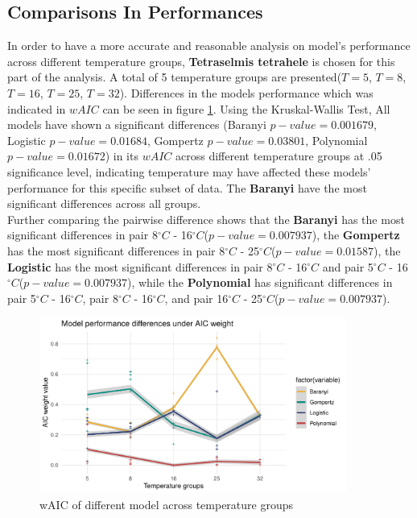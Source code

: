 \documentclass[11pt]{article}
\begin{document}
\subsection{Comparisons In Performances}\label{comparison}
In order to have a more accurate and reasonable analysis on model's performance across different temperature groups, \textbf{Tetraselmis tetrahele} is chosen for this part of the analysis. A total of 5 temperature groups are presented($T=5$, $T=8$, $T=16$, $T=25$, $T=32$). Differences in the models performance which was indicated in $wAIC$ can be seen in figure \ref{fig:tempwaic}. Using the Kruskal-Wallis Test, All models have shown a significant differences (Baranyi $p-value = 0.001679$, Logistic $p-value = 0.01684$, Gompertz $p-value = 0.03801$, Polynomial $p-value = 0.01672$) in its $wAIC$ across different temperature groups at .05 significance level, indicating temperature may have affected these models' performance for this specific subset of data. The \textbf{Baranyi} have the most significant differences across all groups. \\ 
Further comparing the pairwise difference shows that the \textbf{Baranyi} has the most significant differences in pair 8$^\circ C$ - 16$^\circ C$($p-value = 0.007937$), the \textbf{Gompertz} has the most significant differences in pair 8$^\circ C$ - 25$^\circ C$($p-value = 0.01587$), the \textbf{Logistic} has the most significant differences in pair 8$^\circ C$ - 16$^\circ C$ and pair 5$^\circ C$ - 16$^\circ C$($p-value = 0.007937$), while the \textbf{Polynomial} has significant differences in pair 5$^\circ C$ - 16$^\circ C$, pair 8$^\circ C$ - 16$^\circ C$, and pair 16$^\circ C$ - 25$^\circ C$($p-value = 0.007937$).\\
\FloatBarrier 
\begin{figure}[!htbp]
    \centering
    \includegraphics[width=0.9\textwidth]{../Results/anaPlots/wAICtemp.pdf}
    \caption{wAIC of different model across temperature groups }
    \label{fig:tempwaic}
\end{figure}
\end{document}
